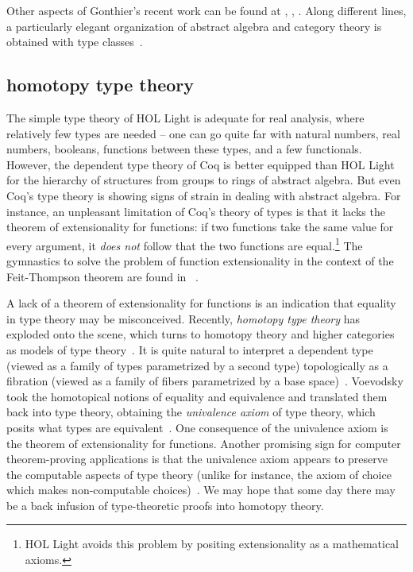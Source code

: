 \documentclass{llncs}
\begin{document}
Other aspects of Gonthier's recent work can be found at
\cite{gonPFSF}, \cite{gonPMS}, \cite{gonC}.
Along different lines, a particularly elegant organization of abstract
algebra and category theory is obtained with type
classes~\cite{SpE11}.

\subsection{homotopy type theory}

The simple type theory of HOL Light is adequate for real analysis,
where relatively few types are needed -- one can go quite far with
natural numbers, real numbers, booleans, functions between these
types, and a few functionals.  However, the dependent type theory of
Coq is better equipped than HOL Light for the hierarchy of structures
from groups to rings of abstract algebra.  But even
Coq's type theory is showing signs of strain in dealing with abstract
algebra.  For instance, an unpleasant limitation of Coq's theory of
types is that it lacks the theorem of extensionality for functions: if
two functions take the same value for every argument, it {\it does
  not} follow that the two functions are equal.\footnote{HOL Light
  avoids this problem by positing extensionality as a mathematical axioms.}  The
gymnastics to solve the problem of function extensionality in the
context of the Feit-Thompson theorem are found in ~\cite{gonMF}.

A lack of a theorem of extensionality for functions is an indication
that equality in type theory may be misconceived. Recently, {\it
  homotopy type theory} has exploded onto the scene, which turns to
homotopy theory and higher categories as models of type
theory~\cite{htt}.  It is quite natural to interpret a dependent type
(viewed as a family of types parametrized by a second type)
topologically as a fibration (viewed as a family of fibers
parametrized by a base space)~\cite{AW09}. Voevodsky took the
homotopical notions of equality and equivalence and translated them
back into type theory, obtaining the {\it univalence axiom} of type
theory, which posits what types are equivalent~\cite{VV11}.  One
consequence of the univalence axiom is the theorem of extensionality
for functions.  Another promising sign for computer theorem-proving
applications is that the univalence axiom appears to preserve the
computable aspects of type theory (unlike for instance, the axiom of
choice which makes non-computable choices)~\cite{LH11}.  We may hope
that some day there may be a back infusion of type-theoretic proofs
into homotopy theory.
\end{document}
